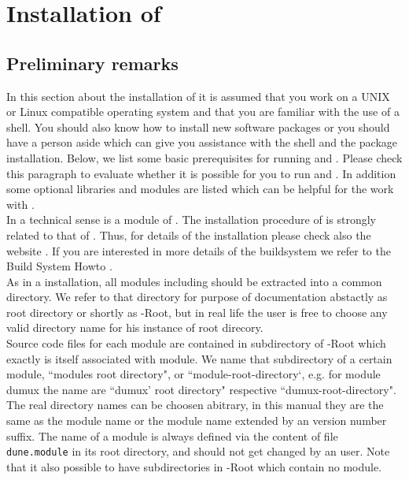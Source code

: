 \section{Installation of \Dumux} \label{install}
\subsection{Preliminary remarks}

In this section about the installation of \Dumux it is assumed that you work on a UNIX or Linux compatible operating system and that you are familiar with the use of a shell. 
You should also know how to install new software packages or you should have a person aside which can give you assistance with the shell and the package installation. 
Below, we list some basic prerequisites for running \Dune and \Dumux. 
Please check this paragraph to evaluate whether it is possible for you to run \Dune and \Dumux. 
In addition some optional libraries and modules are listed which can be helpful for the work with \Dumux. \\

In a technical sense \Dumux is a module of \Dune. 
The installation procedure of \Dumux is strongly related to that of \Dune. 
Thus, for details of the installation please check also the {\Dune} website \cite{DUNE-HP}. 
If you are interested in more details of the buildsystem we refer to the {\Dune} Build System Howto \cite{DUNE-BS}.\\

As in a \Dune installation, all \Dune modules including \Dumux should be extracted into a common directory. We refer to that directory for purpose of documentation abstactly as {\Dune} root directory or shortly as {\Dune}-Root, but in real life the user is free to choose any valid directory name for his instance of {\Dune} root direcory.\\

Source code files for each \Dune module are contained in subdirectory of {\Dune}-Root which exactly is itself associated with module.
We name that subdirectory of a certain module, ``modules root directory", or ``module-root-directory`, e.g. for module dumux the name are  ``dumux' root directory" respective ``dumux-root-directory". The real directory names can be choosen abitrary, in this manual they are the same as the module name or the module name extended by an version number suffix. The name of a module is always defined via the content of file \texttt{dune.module} in its root directory, and should not get changed by an user. Note that it also possible to have subdirectories in \Dune-Root which contain no module.\\


